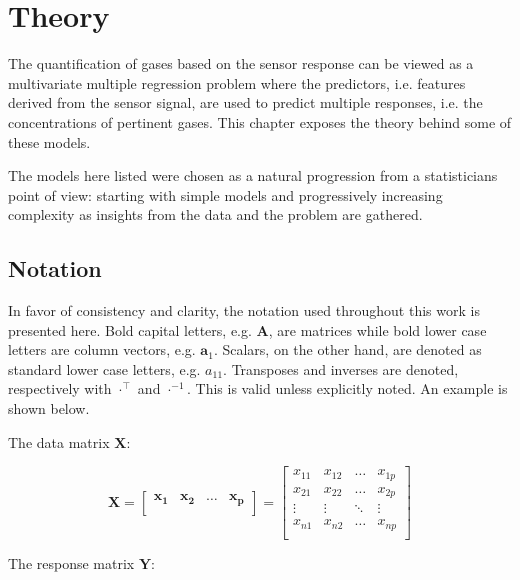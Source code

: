 \chapter{Theory}
\label{cha:theory}

The quantification of gases based on the sensor response can be viewed as a multivariate multiple regression problem where the predictors, i.e. features derived from the sensor signal, are used to predict multiple responses, i.e. the concentrations of pertinent gases. This chapter exposes the theory behind some of these models.

The models here listed were chosen as a natural progression from a statisticians point of view: starting with simple models and progressively increasing complexity as insights from the data and the problem are gathered.
\section{Notation}
\label{sec:notation}

In favor of consistency and clarity, the notation used throughout this work is presented here. Bold capital letters, e.g. $\mathbf{A}$, are matrices while bold lower case letters are column vectors, e.g. $\mathbf{a}_1$. Scalars, on the other hand, are denoted as standard lower case letters, e.g. $a_{11}$. Transposes and inverses are denoted, respectively with $\cdot^\intercal $ and $\cdot^{-1}$. This is valid unless explicitly noted. An example is shown below.

The data matrix $\mathbf{X}$:

\begin{equation*}
	\mathbf{X} = 
	\begin{bmatrix}
		\mathbf{x_1} & \mathbf{x_2} &\dots &\mathbf{x_p}\\
	\end{bmatrix} 
	=
	\begin{bmatrix}
		
		x_{11} & x_{12} & \dots & x_{1p}\\
		x_{21} & x_{22} & \dots & x_{2p}\\
		\vdots  & \vdots & \ddots &\vdots\\
		x_{n1} & x_{n2} & \dots & x_{np}\\
	\end{bmatrix}
\end{equation*}

The response matrix $\mathbf{Y}$:

